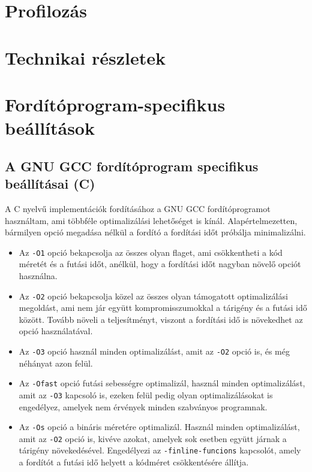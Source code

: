 
\section{Profilozás}
\section{Technikai részletek}
\section{Fordítóprogram-specifikus beállítások}
\subsection{A GNU GCC fordítóprogram specifikus beállításai (C)}
A C nyelvű implementációk fordításához a GNU GCC fordítóprogramot használtam, ami többféle optimalizálási lehetőséget is kínál. Alapértelmezetten, bármilyen opció megadása nélkül a fordító a fordítási időt próbálja minimalizálni.
\begin{itemize}
  \item Az \lstinline{-O1} opció bekapcsolja az összes olyan flaget, ami csökkentheti a kód méretét és a futási időt, anélkül, hogy a fordítási időt nagyban növelő opciót használna.
  \item Az \lstinline{-O2} opció bekapcsolja közel az összes olyan támogatott optimalizálási megoldást, ami nem jár együtt kompromisszumokkal a tárigény és a futási idő között. Tovább növeli a teljesítményt, viszont a fordítási idő is növekedhet az opció használatával.
  \item Az \lstinline{-O3} opció használ minden optimalizálást, amit az \lstinline{-O2} opció is, és még néhányat azon felül.
  \item Az \lstinline{-Ofast} opció futási sebességre optimalizál, használ minden optimalizálást, amit az \lstinline{-O3} kapcsoló is, ezeken felül pedig olyan optimalizálásokat is engedélyez, amelyek nem érvények minden szabványos programnak.
  \item Az \lstinline{-Os} opció a bináris méretére optimalizál. Használ minden optimalizálást, amit az \lstinline{-O2} opció is, kivéve azokat, amelyek sok esetben együtt járnak a tárigény növekedésével. Engedélyezi az \lstinline{-finline-funcions} kapcsolót, amely a fordítót a futási idő helyett a kódméret csökkentésére állítja. 
\end{itemize}
